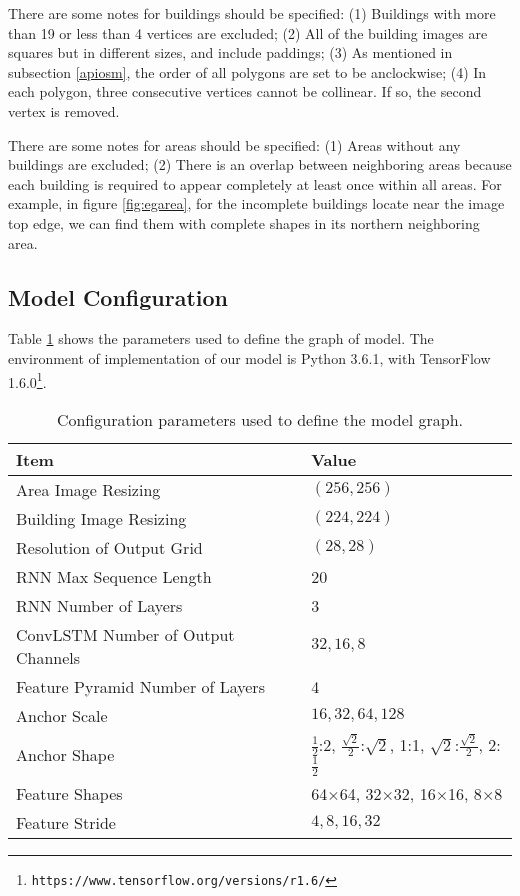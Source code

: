 There are some notes for buildings should be specified: (1) Buildings with more than 19 or less than 4 vertices are excluded; (2) All of the building images are squares but in different sizes, and include paddings; (3) As mentioned in subsection \ref{apiosm}, the order of all polygons are set to be anclockwise; (4) In each polygon, three consecutive vertices cannot be collinear. If so, the second vertex is removed.

There are some notes for areas should be specified: (1) Areas without any buildings are excluded; (2) There is an overlap between neighboring areas because each building is required to appear completely at least once within all areas. For example, in figure \ref{fig:egarea}, for the incomplete buildings locate near the image top edge, we can find them with complete shapes in its northern neighboring area.

\subsection{Model Configuration}\label{config}
Table \ref{tab:configpara} shows the parameters used to define the graph of model. The environment of implementation of our model is Python 3.6.1, with TensorFlow 1.6.0\footnote{\lstinline{https://www.tensorflow.org/versions/r1.6/}}.
\begin{table}[!h]
	\centering
	\caption[Configuration parameters used to define the model graph]{Configuration  parameters used to define the model graph.}
	\label{tab:configpara}
	\begin{tabular}{l|l}
	\hline
	\textbf{Item} & \textbf{Value} \\
	\hline
	Area Image Resizing & $(256, 256)$ \\
	Building Image Resizing & $(224, 224)$ \\
	Resolution of Output Grid & $(28, 28)$ \\
	\hline
	RNN Max Sequence Length & 20 \\
	RNN Number of Layers & 3 \\
	ConvLSTM Number of Output Channels & $32, 16, 8$ \\
	\hline
	Feature Pyramid Number of Layers & 4 \\
	Anchor Scale & $16, 32, 64, 128$ \\
	Anchor Shape & $\frac{1}{2}$:2, $\frac{\sqrt{2}}{2}$:$\sqrt{2}$, 1:1, $\sqrt{2}$:$\frac{\sqrt{2}}{2}$, 2:$\frac{1}{2}$ \\
	Feature Shapes & 64$\times$64, 32$\times$32, 16$\times$16, 8$\times$8 \\
	Feature Stride & $4, 8, 16, 32$ \\
	\hline
	\end{tabular}
\end{table}

